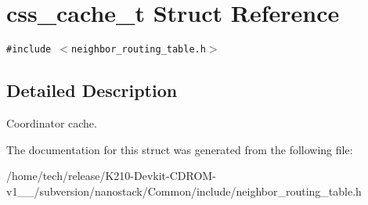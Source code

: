 \hypertarget{structcss__cache__t}{
\section{css\_\-cache\_\-t Struct Reference}
\label{structcss__cache__t}
}
{\tt \#include $<$neighbor\_\-routing\_\-table.h$>$}



\subsection{Detailed Description}
Coordinator cache. 



The documentation for this struct was generated from the following file:\begin{CompactItemize}
\item 
/home/tech/release/K210-Devkit-CDROM-v1\_\_/subversion/nanostack/Common/include/neighbor\_\-routing\_\-table.h\end{CompactItemize}
